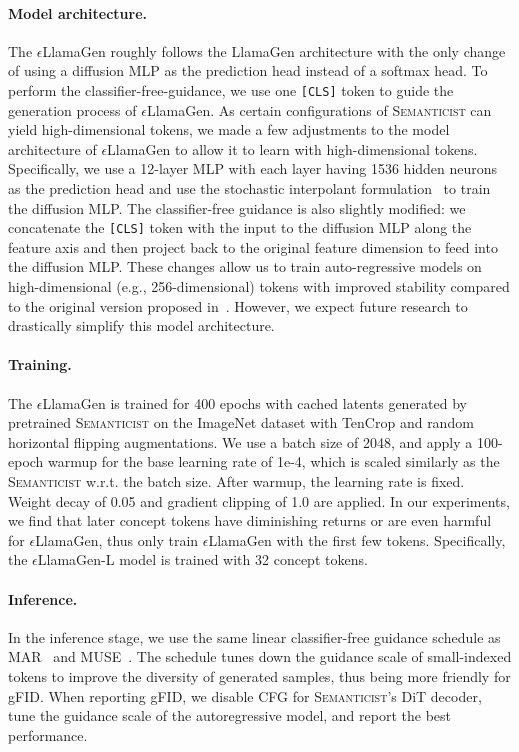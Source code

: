 \documentclass[10pt,twocolumn,letterpaper]{article}
\DeclareRobustCommand{\modelname}{\textsc{Semanticist}\xspace}
\DeclareRobustCommand{\armodelname}{$\epsilon$LlamaGen\xspace}
\begin{document}
\paragraph{Model architecture.}
The \armodelname roughly follows the LlamaGen architecture with the only change of using a diffusion MLP as the prediction head instead of a softmax head.
To perform the classifier-free-guidance, we use one \texttt{[CLS]} token to guide the generation process of \armodelname.
As certain configurations of \modelname can yield high-dimensional tokens, we made a few adjustments to the model architecture of \armodelname to allow it to learn with high-dimensional tokens.
Specifically, we use a 12-layer MLP with each layer having 1536 hidden neurons as the prediction head and use the stochastic interpolant formulation~\cite{sit} to train the diffusion MLP.
The classifier-free guidance is also slightly modified: we concatenate the \texttt{[CLS]} token with the input to the diffusion MLP along the feature axis and then project back to the original feature dimension to feed into the diffusion MLP.
These changes allow us to train auto-regressive models on high-dimensional (e.g., 256-dimensional) tokens with improved stability compared to the original version proposed in~\cite{mar}.
However, we expect future research to drastically simplify this model architecture.

\paragraph{Training.}
The \armodelname is trained for 400 epochs with cached latents generated by pretrained \modelname on the ImageNet dataset with TenCrop and random horizontal flipping augmentations.
We use a batch size of 2048, and apply a 100-epoch warmup for the base learning rate of 1e-4, which is scaled similarly as the \modelname w.r.t. the batch size.
After warmup, the learning rate is fixed.
Weight decay of 0.05 and gradient clipping of 1.0 are applied.
In our experiments, we find that later concept tokens have diminishing returns or are even harmful for \armodelname, thus only train \armodelname with the first few tokens.
Specifically, the \armodelname-L model is trained with 32 concept tokens. 

\paragraph{Inference.}
In the inference stage, we use the same linear classifier-free guidance schedule as MAR~\cite{mar} and MUSE~\cite{muse}. The schedule tunes down the guidance scale of small-indexed tokens to improve the diversity of generated samples, thus being more friendly for gFID.
When reporting gFID, we disable CFG for \modelname's DiT decoder, tune the guidance scale of the autoregressive model, and report the best performance.
\end{document}
